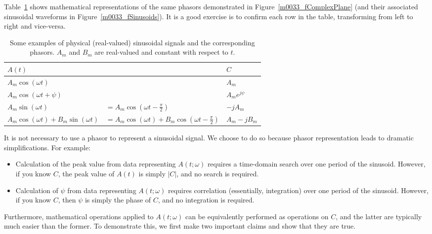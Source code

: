 Table~\ref{m0033_tPhasorExamples} shows mathematical representations of the same phasors demonstrated in Figure~\ref{m0033_fComplexPlane} (and their associated sinusoidal waveforms in Figure~\ref{m0033_fSinusoids}).
It is a good exercise is to confirm each row in the table, transforming from left to right and vice-versa.
%
\begin{table}[t]
\begin{center}
\begin{tabular}{ll|l}
$A(t)$ & ~ & $C$ \\
\hline
$A_m \cos \left( \omega t \right)$ & ~ & $A_m$ \\
$A_m \cos \left( \omega t + \psi \right)$ & ~ & $A_m e^{j\psi}$ \\  
$A_m \sin \left( \omega t \right)$ & $= A_m \cos \left( \omega t - \frac{\pi}{2}\right)$ & $-jA_m$ \\  
$A_m \cos \left( \omega t \right) + B_m \sin \left( \omega t \right)$ & $= A_m \cos \left( \omega t \right) + B_m \cos \left( \omega t - \frac{\pi}{2}\right)$ & $A_m-jB_m$ \\  
\end{tabular}
\end{center}
\caption{\label{m0033_tPhasorExamples}Some examples of physical (real-valued) sinusoidal signals and the corresponding phasors. $A_m$ and $B_m$ are real-valued and constant with respect to $t$. 
}
\end{table}

It is not necessary to use a phasor to represent a sinusoidal signal.  
We choose to do so because phasor representation leads to dramatic simplifications.
For example:
%  
\begin{itemize}
\item Calculation of the peak value from data representing $A(t;\omega)$ requires a time-domain search over one period of the sinusoid. However, if you know $C$, the peak value of $A(t)$ is simply $\left|C\right|$, and no search is required.
\item Calculation of $\psi$ from data representing $A(t;\omega)$ requires correlation (essentially, integration) over one period of the sinusoid. However, if you know $C$, then $\psi$ is simply the phase of $C$, and no integration is required.
\end{itemize}
%
Furthermore, mathematical operations applied to $A(t;\omega)$ can be equivalently performed as operations on $C$, and the latter are typically much easier than the former. 
To demonstrate this, we first make two important claims and show that they are true.

